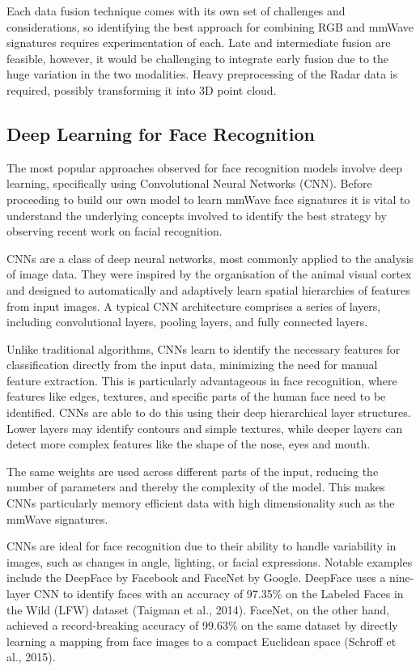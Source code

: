 \documentclass{interim}
\begin{document}
Each data fusion technique comes with its own set of challenges and considerations, so identifying the best approach for combining RGB and mmWave signatures requires experimentation of each. Late and intermediate fusion are feasible, however, it would be challenging to integrate early fusion due to the huge variation in the two modalities. Heavy preprocessing of the Radar data is required, possibly transforming it into 3D point cloud. 


\subsection{Deep Learning for Face Recognition}
The most popular approaches observed for face recognition models involve deep learning, specifically using Convolutional Neural Networks (CNN). Before proceeding to build our own model to learn mmWave face signatures it is vital to understand the underlying concepts involved to identify the best strategy by observing recent work on facial recognition. 

CNNs are a class of deep neural networks, most commonly applied to the analysis of image data. They were inspired by the organisation of the animal visual cortex and designed to automatically and adaptively learn spatial hierarchies of features from input images. A typical CNN architecture comprises a series of layers, including convolutional layers, pooling layers, and fully connected layers.

Unlike traditional algorithms, CNNs learn to identify the necessary features for classification directly from the input data, minimizing the need for manual feature extraction. This is particularly advantageous in face recognition, where features like edges, textures, and specific parts of the human face need to be identified. CNNs are able to do this using their deep hierarchical layer structures. Lower layers may identify contours and simple textures, while deeper layers can detect more complex features like the shape of the nose, eyes and mouth.

The same weights are used across different parts of the input, reducing the number of parameters and thereby the complexity of the model. This makes CNNs particularly memory efficient data with high dimensionality such as the mmWave signatures.

CNNs are ideal for face recognition due to their ability to handle variability in images, such as changes in angle, lighting, or facial expressions. Notable examples include the DeepFace by Facebook and FaceNet by Google. DeepFace uses a nine-layer CNN to identify faces with an accuracy of 97.35\% on the Labeled Faces in the Wild (LFW) dataset (Taigman et al., 2014). FaceNet, on the other hand, achieved a record-breaking accuracy of 99.63\% on the same dataset by directly learning a mapping from face images to a compact Euclidean space (Schroff et al., 2015).
\end{document}
